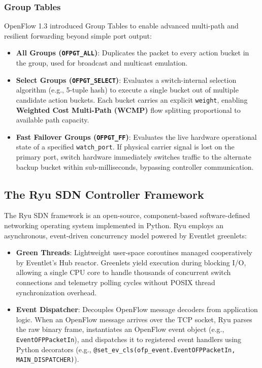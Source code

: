 \documentclass[12pt,a4paper,oneside]{report}
\begin{document}
\subsubsection{Group Tables}
OpenFlow 1.3 introduced Group Tables to enable advanced multi-path and resilient forwarding beyond simple port output:
\begin{itemize}
    \item \textbf{All Groups (\texttt{OFPGT\_ALL})}: Duplicates the packet to every action bucket in the group, used for broadcast and multicast emulation.
    \item \textbf{Select Groups (\texttt{OFPGT\_SELECT})}: Evaluates a switch-internal selection algorithm (e.g., 5-tuple hash) to execute a single bucket out of multiple candidate action buckets. Each bucket carries an explicit \texttt{weight}, enabling \textbf{Weighted Cost Multi-Path (WCMP)} flow splitting proportional to available path capacity.
    \item \textbf{Fast Failover Groups (\texttt{OFPGT\_FF})}: Evaluates the live hardware operational state of a specified \texttt{watch\_port}. If physical carrier signal is lost on the primary port, switch hardware immediately switches traffic to the alternate backup bucket within sub-milliseconds, bypassing controller communication.
\end{itemize}

\subsection{The Ryu SDN Controller Framework}
The Ryu SDN framework \cite{ryucontroller} is an open-source, component-based software-defined networking operating system implemented in Python. Ryu employs an asynchronous, event-driven concurrency model powered by Eventlet greenlets:
\begin{itemize}
    \item \textbf{Green Threads}: Lightweight user-space coroutines managed cooperatively by Eventlet's Hub reactor. Greenlets yield execution during blocking I/O, allowing a single CPU core to handle thousands of concurrent switch connections and telemetry polling cycles without POSIX thread synchronization overhead.
    \item \textbf{Event Dispatcher}: Decouples OpenFlow message decoders from application logic. When an OpenFlow message arrives over the TCP socket, Ryu parses the raw binary frame, instantiates an OpenFlow event object (e.g., \texttt{EventOFPPacketIn}), and dispatches it to registered event handlers using Python decorators (e.g., \texttt{@set\_ev\_cls(ofp\_event.EventOFPPacketIn, MAIN\_DISPATCHER)}).
\end{itemize}
\end{document}

